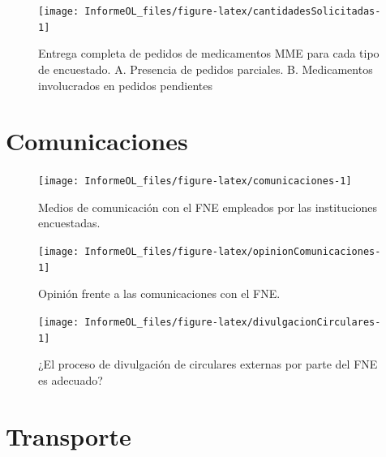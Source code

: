 \documentclass[
  oneside]{book}
\begin{document}
\begin{figure}

{\centering \texttt{[image: InformeOL\_files/figure-latex/cantidadesSolicitadas-1]} 

}

\caption{Entrega completa de pedidos de medicamentos MME para cada tipo de encuestado. A. Presencia de pedidos parciales. B. Medicamentos involucrados en pedidos pendientes}\label{fig:cantidadesSolicitadas}
\end{figure}

\hypertarget{comunicaciones}{%
\chapter{Comunicaciones}\label{comunicaciones}}

\begin{figure}

{\centering \texttt{[image: InformeOL\_files/figure-latex/comunicaciones-1]} 

}

\caption{Medios de comunicación con el FNE empleados por las instituciones encuestadas.}\label{fig:comunicaciones}
\end{figure}
\begin{figure}

{\centering \texttt{[image: InformeOL\_files/figure-latex/opinionComunicaciones-1]} 

}

\caption{Opinión frente a las comunicaciones con el FNE.}\label{fig:opinionComunicaciones}
\end{figure}
\begin{figure}

{\centering \texttt{[image: InformeOL\_files/figure-latex/divulgacionCirculares-1]} 

}

\caption{¿El proceso de divulgación de circulares externas por parte del FNE es adecuado?}\label{fig:divulgacionCirculares}
\end{figure}

\hypertarget{transporte}{%
\chapter{Transporte}\label{transporte}}
\end{document}
